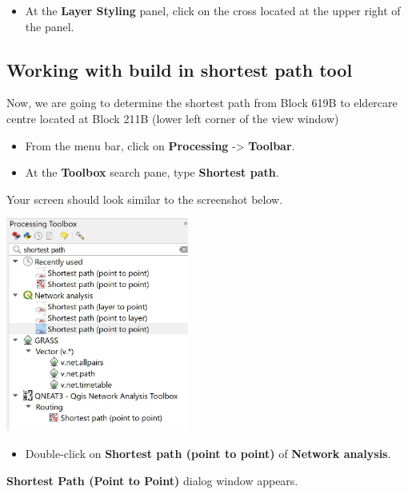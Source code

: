 \documentclass[
  letterpaper,
  DIV=11,
  numbers=noendperiod]{scrreprt}
\providecommand{\tightlist}{%
  \setlength{\itemsep}{0pt}\setlength{\parskip}{0pt}}\usepackage{longtable,booktabs,array}
\begin{document}
\begin{itemize}
\tightlist
\item
  At the \textbf{Layer Styling} panel, click on the cross located at the
  upper right of the panel.
\end{itemize}

\hypertarget{working-with-build-in-shortest-path-tool}{%
\subsection{Working with build in shortest path
tool}\label{working-with-build-in-shortest-path-tool}}

Now, we are going to determine the shortest path from Block 619B to
eldercare centre located at Block 211B (lower left corner of the view
window)

\begin{itemize}
\item
  From the menu bar, click on \textbf{Processing} -\textgreater{}
  \textbf{Toolbar}.
\item
  At the \textbf{Toolbox} search pane, type \textbf{Shortest path}.
\end{itemize}

Your screen should look similar to the screenshot below.

\includegraphics[width=0.45\textwidth,height=\textheight]{./img09/image22.jpg}

\begin{itemize}
\tightlist
\item
  Double-click on \textbf{Shortest path (point to point)} of
  \textbf{Network analysis}.
\end{itemize}

\textbf{Shortest Path (Point to Point)} dialog window appears.
\end{document}
